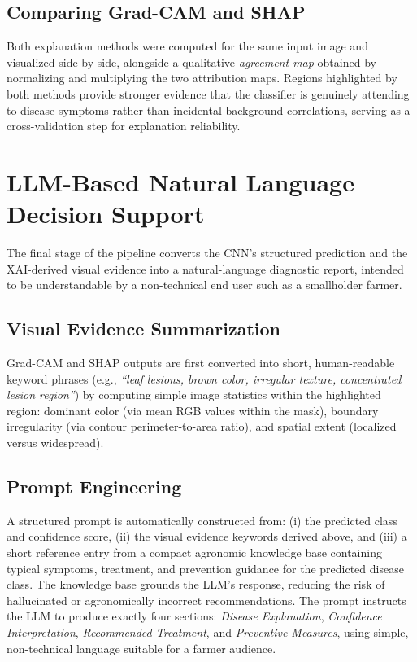 \documentclass[12pt,a4paper,oneside]{report}
\begin{document}
\subsection{Comparing Grad-CAM and SHAP}
Both explanation methods were computed for the same input image and visualized side by side, alongside a
qualitative \textit{agreement map} obtained by normalizing and multiplying the two attribution maps. Regions
highlighted by both methods provide stronger evidence that the classifier is genuinely attending to disease
symptoms rather than incidental background correlations, serving as a cross-validation step for explanation
reliability.

\section{LLM-Based Natural Language Decision Support}
\label{sec:llm}
The final stage of the pipeline converts the CNN's structured prediction and the XAI-derived visual evidence into
a natural-language diagnostic report, intended to be understandable by a non-technical end user such as a
smallholder farmer.

\subsection{Visual Evidence Summarization}
Grad-CAM and SHAP outputs are first converted into short, human-readable keyword phrases (e.g., \textit{``leaf
lesions, brown color, irregular texture, concentrated lesion region''}) by computing simple image statistics
within the highlighted region: dominant color (via mean RGB values within the mask), boundary irregularity (via
contour perimeter-to-area ratio), and spatial extent (localized versus widespread).

\subsection{Prompt Engineering}
A structured prompt is automatically constructed from: (i) the predicted class and confidence score, (ii) the
visual evidence keywords derived above, and (iii) a short reference entry from a compact agronomic knowledge
base containing typical symptoms, treatment, and prevention guidance for the predicted disease class. The
knowledge base grounds the LLM's response, reducing the risk of hallucinated or agronomically incorrect
recommendations. The prompt instructs the LLM to produce exactly four sections: \textit{Disease Explanation},
\textit{Confidence Interpretation}, \textit{Recommended Treatment}, and \textit{Preventive Measures}, using
simple, non-technical language suitable for a farmer audience.
\end{document}
